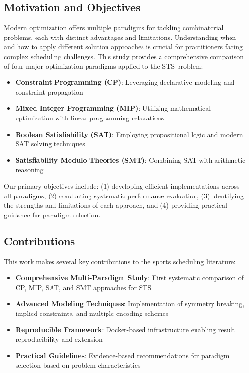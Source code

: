 \documentclass[11pt]{article}
\begin{document}
\subsection{Motivation and Objectives}

Modern optimization offers multiple paradigms for tackling combinatorial problems, each with distinct advantages and limitations. Understanding when and how to apply different solution approaches is crucial for practitioners facing complex scheduling challenges. This study provides a comprehensive comparison of four major optimization paradigms applied to the STS problem:

\begin{itemize}
    \item \textbf{Constraint Programming (CP)}: Leveraging declarative modeling and constraint propagation
    \item \textbf{Mixed Integer Programming (MIP)}: Utilizing mathematical optimization with linear programming relaxations
    \item \textbf{Boolean Satisfiability (SAT)}: Employing propositional logic and modern SAT solving techniques
    \item \textbf{Satisfiability Modulo Theories (SMT)}: Combining SAT with arithmetic reasoning
\end{itemize}

Our primary objectives include: (1) developing efficient implementations across all paradigms, (2) conducting systematic performance evaluation, (3) identifying the strengths and limitations of each approach, and (4) providing practical guidance for paradigm selection.

\subsection{Contributions}

This work makes several key contributions to the sports scheduling literature:

\begin{itemize}
    \item \textbf{Comprehensive Multi-Paradigm Study}: First systematic comparison of CP, MIP, SAT, and SMT approaches for STS
    \item \textbf{Advanced Modeling Techniques}: Implementation of symmetry breaking, implied constraints, and multiple encoding schemes
    \item \textbf{Reproducible Framework}: Docker-based infrastructure enabling result reproducibility and extension
    \item \textbf{Practical Guidelines}: Evidence-based recommendations for paradigm selection based on problem characteristics
\end{itemize}
\end{document}
